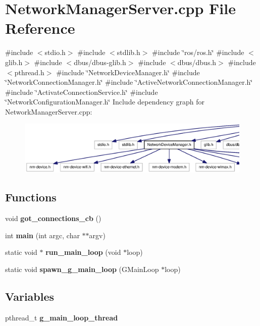 \section{\-Network\-Manager\-Server.\-cpp \-File \-Reference}
\label{NetworkManagerServer_8cpp}
{\ttfamily \#include $<$stdio.\-h$>$}\*
{\ttfamily \#include $<$stdlib.\-h$>$}\*
{\ttfamily \#include \char`\"{}ros/ros.\-h\char`\"{}}\*
{\ttfamily \#include $<$glib.\-h$>$}\*
{\ttfamily \#include $<$dbus/dbus-\/glib.\-h$>$}\*
{\ttfamily \#include $<$dbus/dbus.\-h$>$}\*
{\ttfamily \#include $<$pthread.\-h$>$}\*
{\ttfamily \#include \char`\"{}\-Network\-Device\-Manager.\-h\char`\"{}}\*
{\ttfamily \#include \char`\"{}\-Network\-Connection\-Manager.\-h\char`\"{}}\*
{\ttfamily \#include \char`\"{}\-Active\-Network\-Connection\-Manager.\-h\char`\"{}}\*
{\ttfamily \#include \char`\"{}\-Activate\-Connection\-Service.\-h\char`\"{}}\*
{\ttfamily \#include \char`\"{}\-Network\-Configuration\-Manager.\-h\char`\"{}}\*
\-Include dependency graph for \-Network\-Manager\-Server.\-cpp\-:
\nopagebreak
\begin{figure}[H]
\begin{center}
\leavevmode
\includegraphics[width=350pt]{NetworkManagerServer_8cpp__incl}
\end{center}
\end{figure}
\subsection*{\-Functions}
\begin{DoxyCompactItemize}
\item 
void {\bf got\-\_\-connections\-\_\-cb} ()
\item 
int {\bf main} (int argc, char $\ast$$\ast$argv)
\item 
static void $\ast$ {\bf run\-\_\-main\-\_\-loop} (void $\ast$loop)
\item 
static void {\bf spawn\-\_\-g\-\_\-main\-\_\-loop} (\-G\-Main\-Loop $\ast$loop)
\end{DoxyCompactItemize}
\subsection*{\-Variables}
\begin{DoxyCompactItemize}
\item 
pthread\-\_\-t {\bf g\-\_\-main\-\_\-loop\-\_\-thread}
\end{DoxyCompactItemize}


